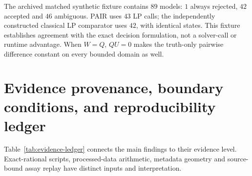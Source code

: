 The archived matched synthetic fixture contains $89$ models: $1$ always rejected, $42$ accepted and $46$ ambiguous. PAIR uses $43$ LP calls; the independently constructed classical LP comparator uses $42$, with identical states. This fixture establishes agreement with the exact decision formulation, not a solver-call or runtime advantage. When $W=Q$, $QU=0$ makes the truth-only pairwise difference constant on every bounded domain as well.

\par
\section{Evidence provenance, boundary conditions, and reproducibility ledger}
\label{supp:ledger}
Table~\ref{tab:evidence-ledger} connects the main findings to their evidence level. Exact-rational scripts, processed-data arithmetic, metadata geometry and source-bound assay replay have distinct inputs and interpretation.
